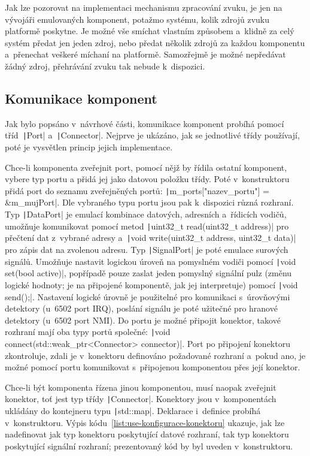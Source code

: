 Jak lze pozorovat na implementaci mechanismu zpracování zvuku, je jen na vývojáři emulovaných komponent, potažmo systému, kolik zdrojů zvuku platformě poskytne. Je možné vše smíchat vlastním způsobem a~klidně za celý systém předat jen jeden zdroj, nebo předat několik zdrojů za každou komponentu a~přenechat veškeré míchaní na platformě. Samozřejmě je možné nepředávat žádný zdroj, přehrávání zvuku tak nebude k~dispozici.

\subsection{Komunikace komponent}
Jak bylo popsáno v~návrhové části, komunikace komponent probíhá pomocí tříd~\texttt|Port| a~\texttt|Connector|. Nejprve je ukázáno, jak se jednotlivé třídy používají, poté je vysvětlen princip jejich implementace.

Chce-li komponenta zveřejnit port, pomocí nějž by řídila ostatní komponent, vybere typ portu a přidá jej jako datovou položku třídy. Poté v~konstruktoru přidá port do seznamu zveřejněných portů: \texttt|m_ports["nazev_portu"] = &m_mujPort|. Dle vybraného typu portu jsou pak k~dispozici různá rozhraní. Typ \texttt|DataPort| je emulací kombinace datových, adresních a~řídicích vodičů, umožňuje komunikovat pomocí metod \texttt|uint32_t read(uint32_t address)| pro přečtení dat z~vybrané adresy a~\texttt|void write(uint32_t address, uint32_t data)| pro zápis dat na zvolenou adresu. Typ \texttt|SignalPort| je poté emulace surových signálů. Umožňuje nastavit logickou úroveň na pomyslném vodiči pomocí \texttt|void set(bool active)|, popřípadě pouze zaslat jeden pomyslný signální pulz (změnu logické hodnoty; je na připojené komponentě, jak jej interpretuje) pomocí \texttt|void send();|. Nastavení logické úrovně je použitelné pro komunikaci s~úrovňovými detektory (u~6502 port IRQ), poslání signálu je poté užitečné pro hranové detektory (u~6502 port NMI).  Do portu je možné připojit konektor, takové rozhraní mají oba typy portů společné: \texttt|void connect(std::weak_ptr<Connector> connector)|. Port po připojení konektoru zkontroluje, zdali je v~konektoru definováno požadované rozhraní a~pokud ano, je možné pomocí portu komunikovat s~připojenou komponentou přes její konektor.

Chce-li být komponenta řízena jinou komponentou, musí naopak zveřejnit konektor, toť jest typ třídy \texttt|Connector|.  Konektory jsou v~komponentách ukládány do kontejneru typu \texttt|std::map|. Deklarace i~definice probíhá v~konstruktoru. Výpis kódu~\ref{list:use-konfigurace-konektoru} ukazuje, jak lze nadefinovat jak typ konektoru poskytující datové rozhraní, tak typ konektoru poskytující signální rozhraní; prezentovaný kód by byl uveden v~konstruktoru.

